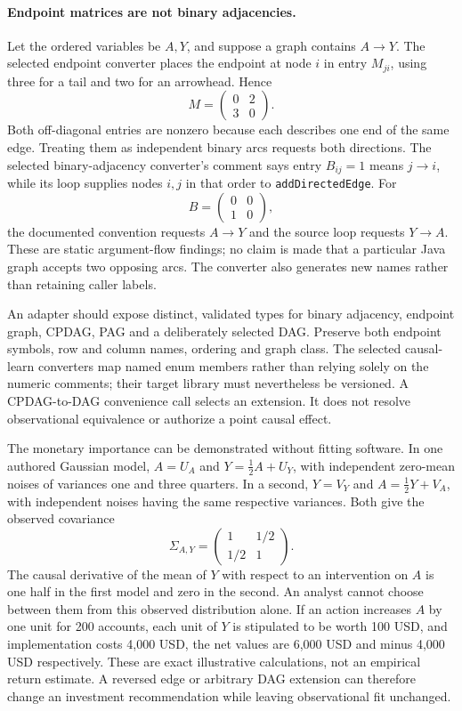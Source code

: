 \paragraph{Endpoint matrices are not binary adjacencies.}
Let the ordered variables be $A,Y$, and suppose a graph contains $A\to Y$.
The selected endpoint converter places the endpoint at node $i$ in entry
$M_{ji}$, using three for a tail and two for an arrowhead. Hence
\[
 M=\begin{pmatrix}0&2\\3&0\end{pmatrix}.
\]
Both off-diagonal entries are nonzero because each describes one end of the
same edge. Treating them as independent binary arcs requests both directions.
The selected binary-adjacency converter's comment says entry $B_{ij}=1$
means $j\to i$, while its loop supplies nodes $i,j$ in that order to
\texttt{addDirectedEdge}. For
\[
 B=\begin{pmatrix}0&0\\1&0\end{pmatrix},
\]
the documented convention requests $A\to Y$ and the source loop requests
$Y\to A$. These are static argument-flow findings; no claim is made that a
particular Java graph accepts two opposing arcs. The converter also generates
new names rather than retaining caller labels.\citep{exec24_pytetrad_source,exec24_pytetrad_choice}

An adapter should expose distinct, validated types for binary adjacency,
endpoint graph, CPDAG, PAG and a deliberately selected DAG. Preserve both
endpoint symbols, row and column names, ordering and graph class. The selected
causal-learn converters map named enum members rather than relying solely on
the numeric comments; their target library must nevertheless be versioned.
A CPDAG-to-DAG convenience call selects an extension. It does not resolve
observational equivalence or authorize a point causal effect.
\citep{exec24_pytetrad_source}

The monetary importance can be demonstrated without fitting software. In one
authored Gaussian model, $A=U_A$ and $Y=\tfrac12 A+U_Y$, with independent
zero-mean noises of variances one and three quarters. In a second, $Y=V_Y$
and $A=\tfrac12 Y+V_A$, with independent noises having the same respective
variances. Both give the observed covariance
\[
 \Sigma_{A,Y}=\begin{pmatrix}1&1/2\\1/2&1\end{pmatrix}.
\]
The causal derivative of the mean of $Y$ with respect to an intervention on
$A$ is one half in the first model and zero in the second. An analyst cannot
choose between them from this observed distribution alone. If an action
increases $A$ by one unit for 200 accounts, each unit of $Y$ is stipulated to
be worth 100 USD, and implementation costs 4,000 USD, the net values are
6,000 USD and minus 4,000 USD respectively. These are exact illustrative
calculations, not an empirical return estimate. A reversed edge or arbitrary
DAG extension can therefore change an investment recommendation while leaving
observational fit unchanged.\citep{exec24_pytetrad_choice}

